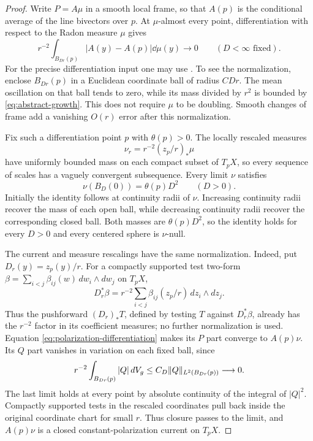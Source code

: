 \begin{proof}
Write \(P=A\mu\) in a smooth local frame, so that \(A(p)\)
is the conditional average of the line bivectors over \(p\).
At \(\mu\)-almost every point, differentiation with respect
to the Radon measure \(\mu\) gives
\begin{equation}\label{eq:polarization-differentiation}
r^{-2}\int_{B_{Dr}(p)}|A(y)-A(p)|\dd\mu(y)\longrightarrow0
\qquad(D<\infty\text{ fixed}).
\end{equation}
For the precise differentiation input one may use
\cite[Theorem~4.33 and Corollary~4.34]{Kinnunen2026}.
To see the normalization, enclose \(B_{Dr}(p)\) in a
Euclidean coordinate ball of radius \(CDr\).
The mean oscillation on that ball tends to zero, while
its mass divided by \(r^2\) is bounded by
\eqref{eq:abstract-growth}. This does not require
\(\mu\) to be doubling. Smooth changes of frame add a
vanishing \(O(r)\) error after this normalization.

Fix such a differentiation point \(p\) with \(\theta(p)>0\).
The locally rescaled measures
\[
\nu_r=r^{-2}(z_p/r)_*\mu
\]
have uniformly bounded mass on each compact subset of
\(T_pX\), so every sequence of scales has a vaguely
convergent subsequence. Every limit \(\nu\) satisfies
\begin{equation}\label{eq:tangent-ball}
\nu(B_D(0))=\theta(p)D^2\qquad(D>0).
\end{equation}
Initially the identity follows at continuity radii of
\(\nu\). Increasing continuity radii recover the mass of
each open ball, while decreasing continuity radii recover
the corresponding closed ball. Both masses are
\(\theta(p)D^2\), so the identity holds for every \(D>0\)
and every centered sphere is \(\nu\)-null.

The current and measure rescalings have the same normalization.
Indeed, put \(D_r(y)=z_p(y)/r\). For a compactly supported
test two-form \(\beta=\sum_{i<j}\beta_{ij}(w)\,dw_i\wedge dw_j\)
on \(T_pX\),
\[
D_r^*\beta=r^{-2}\sum_{i<j}\beta_{ij}(z_p/r)\,dz_i\wedge dz_j.
\]
Thus the pushforward \((D_r)_*T\), defined by testing \(T\)
against \(D_r^*\beta\), already has the \(r^{-2}\) factor
in its coefficient measures; no further normalization is used.
Equation
\eqref{eq:polarization-differentiation} makes its \(P\)
part converge to \(A(p)\nu\). Its \(Q\) part vanishes
in variation on each fixed ball, since
\begin{equation}\label{eq:q-blowup}
r^{-2}\int_{B_{Dr}(p)}|Q|\,dV_g
\le C_D\|Q\|_{L^2(B_{Dr}(p))}\longrightarrow0.
\end{equation}
The last limit holds at every point by absolute continuity
of the integral of \(|Q|^2\). Compactly supported tests
in the rescaled coordinates pull back inside the original
coordinate chart for small \(r\). Thus closure passes to
the limit, and \(A(p)\nu\) is a closed constant-polarization
current on \(T_pX\).


\end{proof}
